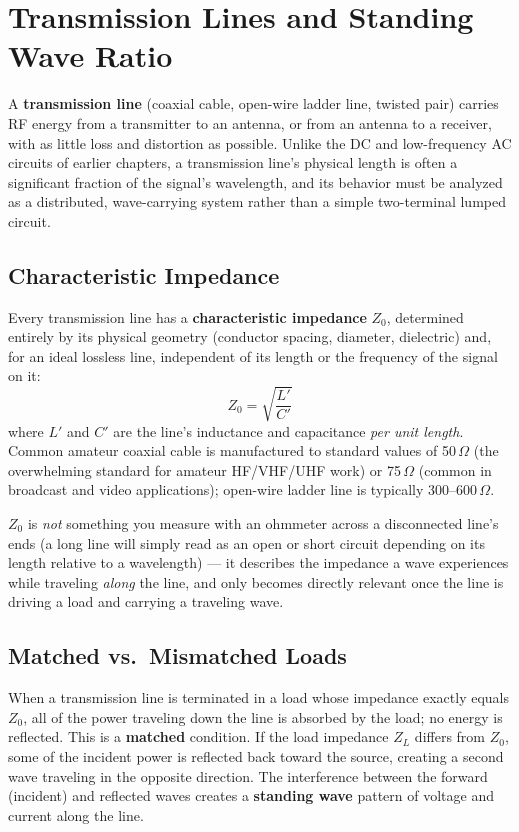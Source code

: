 \chapter{Transmission Lines and Standing Wave Ratio}
\label{ch:transmission-lines}

A \textbf{transmission line} (coaxial cable, open-wire ladder line,
twisted pair) carries RF energy from a transmitter to an antenna, or
from an antenna to a receiver, with as little loss and distortion as
possible. Unlike the DC and low-frequency AC circuits of earlier
chapters, a transmission line's physical length is often a significant
fraction of the signal's wavelength, and its behavior must be analyzed
as a distributed, wave-carrying system rather than a simple two-terminal
lumped circuit.

\section{Characteristic Impedance}

Every transmission line has a \textbf{characteristic impedance} $Z_0$,
determined entirely by its physical geometry (conductor spacing,
diameter, dielectric) and, for an ideal lossless line, independent of
its length or the frequency of the signal on it:
\[
Z_0 = \sqrt{\frac{L'}{C'}}
\]
where $L'$ and $C'$ are the line's inductance and capacitance \emph{per
unit length}. Common amateur coaxial cable is manufactured to standard
values of 50\,$\Omega$ (the overwhelming standard for amateur HF/VHF/UHF
work) or 75\,$\Omega$ (common in broadcast and video applications);
open-wire ladder line is typically 300--600\,$\Omega$.

\begin{keyidea}
$Z_0$ is \emph{not} something you measure with an ohmmeter across a
disconnected line's ends (a long line will simply read as an open or
short circuit depending on its length relative to a wavelength) --- it
describes the impedance a wave experiences while traveling \emph{along}
the line, and only becomes directly relevant once the line is driving a
load and carrying a traveling wave.
\end{keyidea}

\section{Matched vs.\ Mismatched Loads}

When a transmission line is terminated in a load whose impedance exactly
equals $Z_0$, all of the power traveling down the line is absorbed by
the load; no energy is reflected. This is a \textbf{matched} condition.
If the load impedance $Z_L$ differs from $Z_0$, some of the incident
power is reflected back toward the source, creating a second wave
traveling in the opposite direction. The interference between the
forward (incident) and reflected waves creates a \textbf{standing
wave} pattern of voltage and current along the line.

